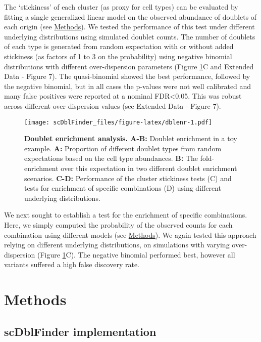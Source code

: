 \documentclass[10pt,a4paper,twocolumn]{article}
\begin{document}
The `stickiness' of each cluster (as proxy for cell types) can be evaluated by fitting a single generalized linear model on the observed abundance of doublets of each origin (see \protect\hyperlink{methods}{Methods}).
We tested the performance of this test under different underlying distributions using simulated doublet counts.
The number of doublets of each type is generated from random expectation with or without added stickiness (as factors of 1 to 3 on the probability) using negative binomial distributions with different over-dispersion parameters (Figure \ref{fig:dblenr}C and Extended Data - Figure 7).
The quasi-binomial showed the best performance, followed by the negative binomial, but in all cases the p-values were not well calibrated and many false positives were reported at a nominal FDR\textless0.05.
This was robust across different over-dispersion values (see Extended Data - Figure 7).

\begin{figure}
\centering
\texttt{[image: scDblFinder\_files/figure-latex/dblenr-1.pdf]}
\caption{\label{fig:dblenr}\textbf{Doublet enrichment analysis. A-B:} Doublet enrichment in a toy example. \textbf{A:} Proportion of different doublet types from random expectations based on the cell type abundances. \textbf{B:} The fold-enrichment over this expectation in two different doublet enrichment scenarios. \textbf{C-D:} Performance of the cluster stickiness tests (C) and tests for enrichment of specific combinations (D) using different underlying distributions.}
\end{figure}

We next sought to establish a test for the enrichment of specific combinations.
Here, we simply computed the probability of the observed counts for each combination using different models (see \protect\hyperlink{methods}{Methods}).
We again tested this approach relying on different underlying distributions, on simulations with varying over-dispersion (Figure \ref{fig:dblenr}C).
The negative binomial performed best, however all variants suffered a high false discovery rate.

\section*{Methods}


\subsection{scDblFinder implementation}
\end{document}

